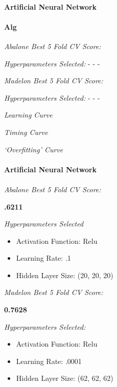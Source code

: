\documentclass[11pt]{article}
\begin{document}
\hypertarget{artificial-neural-network}{%
\paragraph{Artificial Neural Network}\label{artificial-neural-network}}

    \hypertarget{alg}{%
\paragraph{Alg}\label{alg}}

\emph{Abalone Best 5 Fold CV Score:}

\emph{Hyperparameters Selected:} - - -

\emph{Madelon Best 5 Fold CV Score:}

\emph{Hyperparameters Selected:} - - -

\emph{Learning Curve}

\emph{Timing Curve}

\emph{`Overfitting' Curve}

    \hypertarget{artificial-neural-network}{%
\paragraph{Artificial Neural Network}\label{artificial-neural-network}}

\hypertarget{section}{%
\paragraph{}\label{section}}

\emph{Abalone Best 5 Fold CV Score:}

\textbf{.6211}

\emph{Hyperparameters Selected}

\begin{itemize}
\item
  Activation Function: Relu
\item
  Learning Rate: .1
\item
  Hidden Layer Size: (20, 20, 20)
\end{itemize}

\emph{Madelon Best 5 Fold CV Score:}

\textbf{0.7628}

\emph{Hyperparameters Selected:}

\begin{itemize}
\item
  Activation Function: Relu
\item
  Learning Rate: .0001
\item
  Hidden Layer Size: (62, 62, 62)
\end{itemize}
\end{document}
